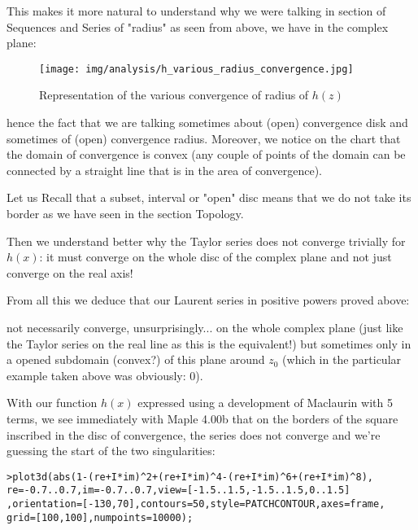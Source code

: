 	This makes it more natural to understand why we were talking in section of Sequences and Series of "radius" as seen from above, we have in the complex plane:
	\begin{figure}[H]
		\begin{center}
			\texttt{[image: img/analysis/h\_various\_radius\_convergence.jpg]}
		\end{center}	
		\caption{Representation of the various convergence of radius of $h(z)$}
	\end{figure}
	hence the fact that we are talking sometimes about (open) convergence disk and sometimes of (open) convergence radius. Moreover, we notice on the chart that the domain of convergence is convex (any couple of points of the domain can be connected by a straight line that is in the area of convergence).
	\begin{tcolorbox}[title=Remark,arc=10pt,breakable,drop lifted shadow,
  skin=enhanced,
  skin first is subskin of={enhancedfirst}{arc=10pt,no shadow},
  skin middle is subskin of={enhancedmiddle}{arc=10pt,no shadow},
  skin last is subskin of={enhancedlast}{drop lifted shadow}]
	Let us Recall that a subset, interval or "open" disc means that we do not take its border as we have seen in the section Topology.
	\end{tcolorbox}
	Then we understand better why the Taylor series does not converge trivially for $h(x)$: it must converge on the whole disc of the complex plane and not just converge on the real axis!
	
	From all this we deduce that our Laurent series in positive powers proved above:
	
	not necessarily converge, unsurprisingly... on the whole complex plane (just like the Taylor series on the real line as this is the equivalent!) but sometimes only in a opened subdomain (convex?) of this plane around $z_0$ (which in the particular example taken above was obviously: $0$).
	
	With our function $h(x)$ expressed using a development of Maclaurin with 5 terms, we see immediately with Maple 4.00b that on the borders of the square inscribed in the disc of convergence, the series does not converge and we're guessing the start of the two singularities:
	
	\texttt{>plot3d(abs(1-(re+I*im)\string^2+(re+I*im)\string^4-(re+I*im)\string^6+(re+I*im)\string^8),\\
	re=-0.7..0.7,im=-0.7..0.7,view=[-1.5..1.5,-1.5..1.5,0..1.5]\\
	,orientation=[-130,70],contours=50,style=PATCHCONTOUR,axes=frame,\\
	grid=[100,100],numpoints=10000);}
	
